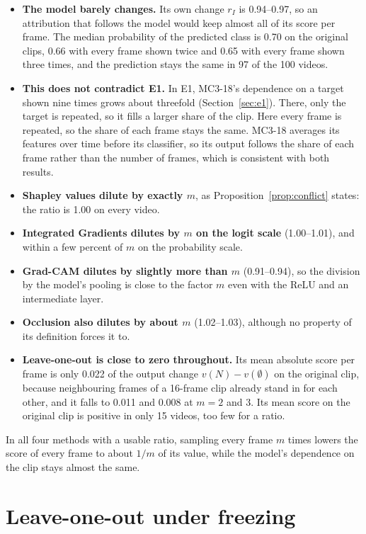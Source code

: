 \begin{itemize}
  \item \textbf{The model barely changes.} Its own change $r_I$ is 0.94--0.97, so an attribution that follows the model would keep almost all of its score per frame. The median probability of the predicted class is 0.70 on the original clips, 0.66 with every frame shown twice and 0.65 with every frame shown three times, and the prediction stays the same in 97 of the 100 videos.
  \item \textbf{This does not contradict E1.} In E1, MC3-18's dependence on a target shown nine times grows about threefold (Section~\ref{sec:e1}). There, only the target is repeated, so it fills a larger share of the clip. Here every frame is repeated, so the share of each frame stays the same. MC3-18 averages its features over time before its classifier, so its output follows the share of each frame rather than the number of frames, which is consistent with both results.
  \item \textbf{Shapley values dilute by exactly $m$}, as Proposition~\ref{prop:conflict} states: the ratio is 1.00 on every video.
  \item \textbf{Integrated Gradients dilutes by $m$ on the logit scale} (1.00--1.01), and within a few percent of $m$ on the probability scale.
  \item \textbf{Grad-CAM dilutes by slightly more than $m$} (0.91--0.94), so the division by the model's pooling is close to the factor $m$ even with the ReLU and an intermediate layer.
  \item \textbf{Occlusion also dilutes by about $m$} (1.02--1.03), although no property of its definition forces it to.
  \item \textbf{Leave-one-out is close to zero throughout.} Its mean absolute score per frame is only 0.022 of the output change $v(N) - v(\emptyset)$ on the original clip, because neighbouring frames of a 16-frame clip already stand in for each other, and it falls to 0.011 and 0.008 at $m = 2$ and $3$. Its mean score on the original clip is positive in only 15 videos, too few for a ratio.
\end{itemize}
In all four methods with a usable ratio, sampling every frame $m$ times lowers the score of every frame to about $1/m$ of its value, while the model's dependence on the clip stays almost the same.

\section{Leave-one-out under freezing}
\label{app:loo-freeze}

